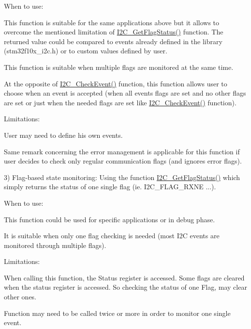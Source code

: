 When to use\+:
\begin{DoxyItemize}
\item This function is suitable for the same applications above but it allows to overcome the mentioned limitation of \hyperlink{agilefox_2library_2src_2stm32f10x__i2c_8c_a9aefe6c49ded931ae087ff44a47b87f3}{I2\+C\+\_\+\+Get\+Flag\+Status()} function. The returned value could be compared to events already defined in the library (stm32f10x\+\_\+i2c.\+h) or to custom values defined by user.
\item This function is suitable when multiple flags are monitored at the same time.
\item At the opposite of \hyperlink{agilefox_2library_2src_2stm32f10x__i2c_8c_a7a2dae90ca87dd8b95fee3fb675a7bd3}{I2\+C\+\_\+\+Check\+Event()} function, this function allows user to choose when an event is accepted (when all events flags are set and no other flags are set or just when the needed flags are set like \hyperlink{agilefox_2library_2src_2stm32f10x__i2c_8c_a7a2dae90ca87dd8b95fee3fb675a7bd3}{I2\+C\+\_\+\+Check\+Event()} function).
\end{DoxyItemize}

Limitations\+:
\begin{DoxyItemize}
\item User may need to define his own events.
\item Same remark concerning the error management is applicable for this function if user decides to check only regular communication flags (and ignores error flags).
\end{DoxyItemize}

3) Flag-\/based state monitoring\+: Using the function \hyperlink{agilefox_2library_2src_2stm32f10x__i2c_8c_a9aefe6c49ded931ae087ff44a47b87f3}{I2\+C\+\_\+\+Get\+Flag\+Status()} which simply returns the status of one single flag (ie. I2\+C\+\_\+\+F\+L\+A\+G\+\_\+\+R\+X\+NE ...).
\begin{DoxyItemize}
\item When to use\+:
\begin{DoxyItemize}
\item This function could be used for specific applications or in debug phase.
\item It is suitable when only one flag checking is needed (most I2C events are monitored through multiple flags).
\end{DoxyItemize}
\item Limitations\+:
\begin{DoxyItemize}
\item When calling this function, the Status register is accessed. Some flags are cleared when the status register is accessed. So checking the status of one Flag, may clear other ones.
\item Function may need to be called twice or more in order to monitor one single event.
\end{DoxyItemize}
\end{DoxyItemize}


